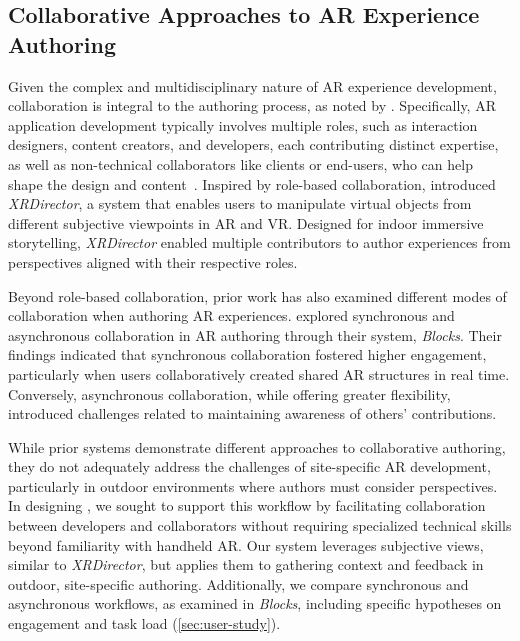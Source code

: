 \subsection{Collaborative Approaches to AR Experience Authoring}
Given the complex and multidisciplinary nature of AR experience development, collaboration is integral to the authoring process, as noted by \citet{kraussCurrentPracticesChallenges2021}. Specifically, AR application development typically involves multiple roles, such as interaction designers, content creators, and developers, each contributing distinct expertise, as well as non-technical collaborators like clients or end-users, who can help shape the design and content~\cite{kraussElementsXRPrototyping2022}. Inspired by role-based collaboration, \citet{nebelingXRDirectorRoleBasedCollaborative2020} introduced \textit{XRDirector}, a system that enables users to manipulate virtual objects from different subjective viewpoints in AR and VR. Designed for indoor immersive storytelling, \textit{XRDirector} enabled multiple contributors to author experiences from perspectives aligned with their respective roles.

Beyond role-based collaboration, prior work has also examined different modes of collaboration when authoring AR experiences. \citet{guoBlocksCollaborativePersistent2019} explored synchronous and asynchronous collaboration in AR authoring through their system, \textit{Blocks}. Their findings indicated that synchronous collaboration fostered higher engagement, particularly when users collaboratively created shared AR structures in real time. Conversely, asynchronous collaboration, while offering greater flexibility, introduced challenges related to maintaining awareness of others' contributions.

While prior systems demonstrate different approaches to collaborative authoring, they do not adequately address the challenges of site-specific AR development, particularly in outdoor environments where \exsitu authors must consider \insitu perspectives. In designing \SystemName, we sought to support this workflow by facilitating collaboration between \exsitu developers and \insitu collaborators without requiring specialized technical skills beyond familiarity with handheld AR. Our system leverages subjective views, similar to \textit{XRDirector}, but applies them to gathering \insitu context and feedback in outdoor, site-specific authoring. Additionally, we compare synchronous and asynchronous workflows, as examined in \textit{Blocks}, including specific hypotheses on engagement and task load (\cref{sec:user-study}).

